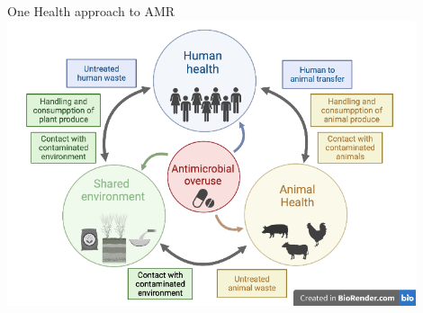 \documentclass[mathserif,11pt]{beamer}
\begin{document}
\begin{frame}{One Health approach to AMR}
	\centering
	\includegraphics[width=0.9\textwidth]{Figures/One_health.png}
\end{frame}
\end{document}
